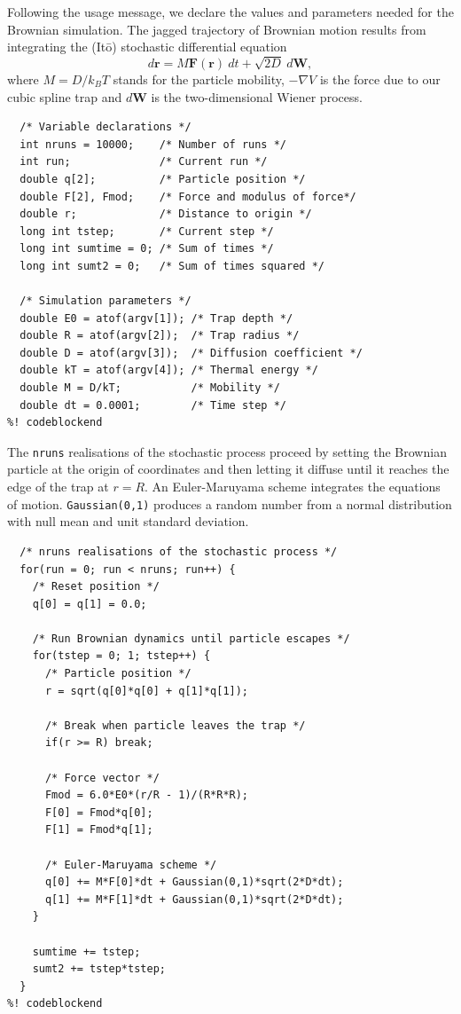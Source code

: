 \documentclass{article}
\begin{document}
Following the usage message, we declare the values and parameters needed for the
Brownian simulation. The jagged trajectory of Brownian motion results from
integrating the (It\=o) stochastic differential equation
\begin{equation}
  d\mathbf{r} = M \mathbf{F}(\mathbf{r})\ dt + \sqrt{2 D}\ d\mathbf{W},
\end{equation}
where $M = D/k_BT$ stands for the particle mobility, $-\nabla V$ is the force
due to our cubic spline trap and $d\mathbf{W}$ is the two-dimensional Wiener
process.

\begin{lstlisting}[frame=single]
%! codeblock: variable_declarations
  /* Variable declarations */
  int nruns = 10000;    /* Number of runs */
  int run;              /* Current run */
  double q[2];          /* Particle position */
  double F[2], Fmod;    /* Force and modulus of force*/
  double r;             /* Distance to origin */
  long int tstep;       /* Current step */
  long int sumtime = 0; /* Sum of times */
  long int sumt2 = 0;   /* Sum of times squared */

  /* Simulation parameters */
  double E0 = atof(argv[1]); /* Trap depth */
  double R = atof(argv[2]);  /* Trap radius */
  double D = atof(argv[3]);  /* Diffusion coefficient */
  double kT = atof(argv[4]); /* Thermal energy */
  double M = D/kT;           /* Mobility */
  double dt = 0.0001;        /* Time step */
%! codeblockend
\end{lstlisting}

The \texttt{nruns} realisations of the stochastic process proceed by setting the
Brownian particle at the origin of coordinates and then letting it diffuse until
it reaches the edge of the trap at $r = R$. An Euler-Maruyama scheme integrates
the equations of motion. \texttt{Gaussian(0,1)} produces a random number from a
normal distribution with null mean and unit standard deviation.

\begin{lstlisting}[frame=single]
%! codeblock: Brownian_simulation
  /* nruns realisations of the stochastic process */
  for(run = 0; run < nruns; run++) {
    /* Reset position */
    q[0] = q[1] = 0.0;

    /* Run Brownian dynamics until particle escapes */
    for(tstep = 0; 1; tstep++) {
      /* Particle position */
      r = sqrt(q[0]*q[0] + q[1]*q[1]);

      /* Break when particle leaves the trap */
      if(r >= R) break;

      /* Force vector */
      Fmod = 6.0*E0*(r/R - 1)/(R*R*R);
      F[0] = Fmod*q[0];
      F[1] = Fmod*q[1];

      /* Euler-Maruyama scheme */
      q[0] += M*F[0]*dt + Gaussian(0,1)*sqrt(2*D*dt);
      q[1] += M*F[1]*dt + Gaussian(0,1)*sqrt(2*D*dt);
    }

    sumtime += tstep;
    sumt2 += tstep*tstep;
  }
%! codeblockend
\end{lstlisting}
\end{document}
